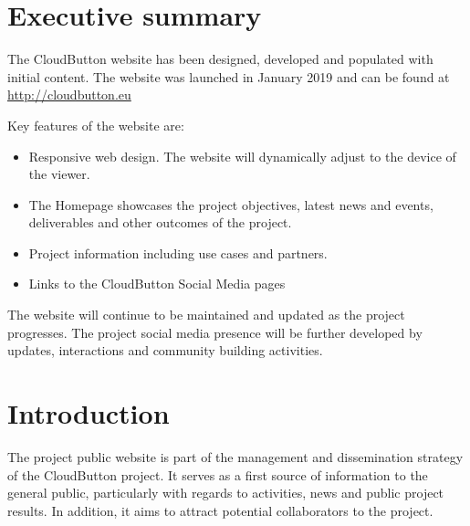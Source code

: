 \documentclass[a4paper,11pt]{article}
\numberwithin{table}{subsection} %
\begin{document}

\clearpage\setcounter{page}{1}\pagestyle{HeadAndFootPageTOC}

\tableofcontents %
%





\clearpage\setcounter{page}{1}\pagestyle{HeadAndFootPage}

\section{Executive summary}

The CloudButton website has been designed, developed and populated with initial content. 
The website was launched in January 2019 and can be found at \url{http://cloudbutton.eu}

Key features of the website are:
\begin{itemize}
\item Responsive web design. The website will dynamically adjust to the device of the viewer.
\item The Homepage showcases the project objectives, latest news and events, deliverables and other outcomes of the project.
\item Project information including use cases and partners.
\item Links to the CloudButton Social Media pages
\end{itemize}

The website will continue to be maintained and updated as the project progresses.
The project social media presence will be further developed by updates, interactions and community building activities.

\newpage

\section{Introduction}

The project public website is part of the management and dissemination strategy of the CloudButton project. 
It serves as a first source of information to the general public, particularly with regards to activities, news and public project results.
In addition, it aims to attract potential collaborators to the project.
\end{document}
